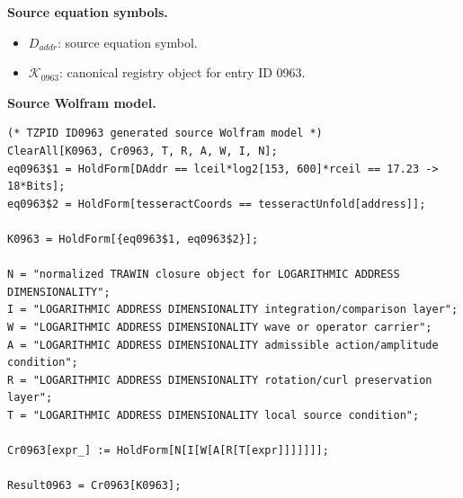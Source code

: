 \begin{minipage}[t]{0.49\linewidth}
\begingroup
\small
\raggedright
\textbf{Source equation symbols.}\par
\begin{itemize}[leftmargin=1.35em,itemsep=1pt,topsep=1pt,parsep=0pt]
    \item $D_{addr}$: source equation symbol.
    \item $\mathcal{K}_{0963}$: canonical registry object for entry ID 0963.
\end{itemize}
\endgroup
\end{minipage}\hfill
\begin{minipage}[t]{0.47\linewidth}
\begingroup
\scriptsize
\raggedright
\textbf{Source Wolfram model.}\par
\begin{Verbatim}[fontsize=\tiny,breaklines=true,breakanywhere=true]
(* TZPID ID0963 generated source Wolfram model *)
ClearAll[K0963, Cr0963, T, R, A, W, I, N];
eq0963$1 = HoldForm[DAddr == lceil*log2[153, 600]*rceil == 17.23 -> 18*Bits];
eq0963$2 = HoldForm[tesseractCoords == tesseractUnfold[address]];

K0963 = HoldForm[{eq0963$1, eq0963$2}];

N = "normalized TRAWIN closure object for LOGARITHMIC ADDRESS DIMENSIONALITY";
I = "LOGARITHMIC ADDRESS DIMENSIONALITY integration/comparison layer";
W = "LOGARITHMIC ADDRESS DIMENSIONALITY wave or operator carrier";
A = "LOGARITHMIC ADDRESS DIMENSIONALITY admissible action/amplitude condition";
R = "LOGARITHMIC ADDRESS DIMENSIONALITY rotation/curl preservation layer";
T = "LOGARITHMIC ADDRESS DIMENSIONALITY local source condition";

Cr0963[expr_] := HoldForm[N[I[W[A[R[T[expr]]]]]]];

Result0963 = Cr0963[K0963];
\end{Verbatim}
\endgroup
\end{minipage}

